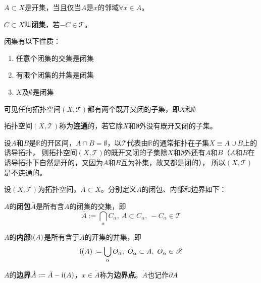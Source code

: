 \begin{theorem}
$A \subset X$是开集，当且仅当$A$是$x$的邻域$\forall x \in A$。
\end{theorem}

\begin{definition}
$C \subset X$叫\textbf{闭集}，若$-C \in \mathscr{T}$。
\end{definition}

\begin{theorem}
闭集有以下性质：
\begin{enumerate}[（a）]
\item 任意个闭集的交集是闭集
\item 有限个闭集的并集是闭集
\item $X$及$\emptyset$是闭集
\end{enumerate}
\end{theorem}

可见任何拓扑空间$(X, \mathscr{T})$都有两个既开又闭的子集，即$X$和$\emptyset$

\begin{definition}
拓扑空间$(X, \mathscr{T})$称为\textbf{连通}的，若它除$X$和$\emptyset$外没有既开又闭的子集。
\end{definition}

\begin{example}
设$A$和$B$是$\mathbb{R}$的开区间，$A \cap B = \emptyset$，以$\mathscr{T}$代表由$\mathbb{R}$的通常拓扑在子集$X \equiv A \cup B$上的诱导拓扑，
则拓扑空间$(X, \mathscr{T})$的既开又闭的子集除$X$和$\emptyset$外还有$A$和$B$（$A$和$B$在诱导拓扑下自然是开的，又因为$A$和$B$互为补集，故又都是闭的），
所以$(X, \mathscr{T})$是不连通的。
\end{example}

设$(X, \mathscr{T})$为拓扑空间，$A \subset X$。分别定义$A$的闭包、内部和边界如下：

\begin{definition}
$A$的\textbf{闭包}$\bar{A}$是所有含$A$的闭集的交集，即
$$\bar{A} := \bigcap_\alpha C_\alpha, ~ A \subset C_\alpha, ~ -C_\alpha \in \mathscr{T}$$
\end{definition}

\begin{definition}
$A$的\textbf{内部}$\operatorname{i}(A)$是所有含于$A$的开集的并集，即
$$\operatorname{i}(A) := \bigcup_\alpha O_\alpha, ~ O_\alpha \subset A, ~ O_\alpha \in \mathscr{T}$$
\end{definition}

\begin{definition}
$A$的\textbf{边界}$\dot{A} := \bar{A} - \operatorname{i}(A)$，$x \in \dot{A}$称为\textbf{边界点}。$\dot{A}$也记作$\partial A$
\end{definition}

